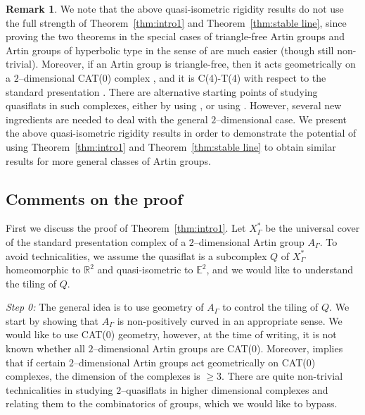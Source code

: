 \documentclass[11pt]{amsart}
\theoremstyle{definition}
\newtheorem{remark}[theorem]{Remark}
\newcommand{\Xa}{X^{\ast}}
\begin{document}
\begin{remark}
We note that the above quasi-isometric rigidity results do not use the full strength of Theorem~\ref{thm:intro1} and Theorem~\ref{thm:stable line}, since proving the two theorems in the special cases of triangle-free Artin groups and Artin groups of hyperbolic type in the sense of \cite{MR2174269} are much easier (though still non-trivial). Moreover, if an Artin group is triangle-free, then it acts geometrically on a $2$--dimensional CAT(0) complex \cite{brady2000three}, and it is C(4)-T(4) with respect to the standard presentation \cite{Pride}. There are alternative starting points of studying quasiflats in such complexes, either by using \cite{bks}, or using \cite{olshanskii2017flat}. However, several new ingredients are needed to deal with the general $2$--dimensional case. We present the above quasi-isometric rigidity results in order to demonstrate the potential of using Theorem~\ref{thm:intro1} and Theorem~\ref{thm:stable line} to obtain similar results for more general classes of Artin groups.
\end{remark}


\subsection*{Comments on the proof}
First we discuss the proof of Theorem~\ref{thm:intro1}. Let $\Xa_\Gamma$ be the universal cover of the standard presentation complex of a $2$--dimensional Artin group $A_\Gamma$. To avoid technicalities, we assume the quasiflat is a subcomplex $Q$ of $\Xa_\Gamma$ homeomorphic to $\mathbb R^2$ and quasi-isometric to $\mathbb E^2$, and we would like to understand the tiling of $Q$.
\medskip

\noindent
\emph{Step 0:} The general idea is to use geometry of $A_\Gamma$ to control the tiling of $Q$. We start by showing that $A_\Gamma$ is non-positively curved in an appropriate sense. We would like to use CAT(0) geometry, however, at the time of writing, it is not known whether all $2$--dimensional Artin groups are CAT(0). Moreover, \cite{brady2002two} implies that if certain $2$--dimensional Artin groups act geometrically on CAT(0) complexes, the dimension of the complexes is $\ge 3$. There are quite non-trivial technicalities in studying $2$--quasiflats in higher dimensional complexes and relating them to the combinatorics of groups, which we would like to bypass.
\end{document}
